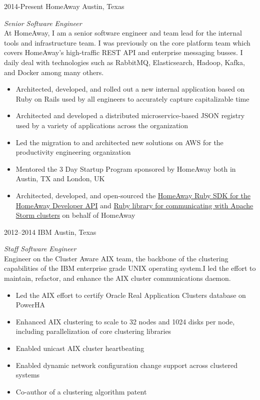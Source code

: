 \documentclass{friggeri-cv} %
\begin{document}
\begin{entrylist}
\entry
{2014-Present}
{HomeAway}
{Austin, Texas}
{\emph{Senior Software Engineer} \\
At HomeAway, I am a senior software engineer and team lead for the internal tools and infrastructure team. I was previously on the core platform team which covers HomeAway's high-traffic REST API and enterprise messaging busses. I daily deal with technologies such as RabbitMQ, Elasticsearch, Hadoop, Kafka, and Docker among many others. \\
\begin{itemize}
\item Architected, developed, and rolled out a new internal application based on Ruby on Rails used by all engineers to accurately capture capitalizable time
\item Architected and developed a distributed microservice-based JSON registry used by a variety of applications across the organization
\item Led the migration to and architected new solutions on AWS for the productivity engineering organization
\item Mentored the 3 Day Startup Program sponsored by HomeAway both in Austin, TX and London, UK
\item Architected, developed, and open-sourced the \href{https://github.com/homeaway/homeaway_api_ruby}{HomeAway Ruby SDK for the HomeAway Developer API} and \href{https://github.com/homeaway/homeaway-storm}{Ruby library for communicating with Apache Storm clusters} on behalf of HomeAway
\end{itemize}}
\end{entrylist}
\begin{entrylist}
\entry
{2012--2014}
{IBM}
{Austin, Texas}
{\emph{Staff Software Engineer} \\
Engineer on the Cluster Aware AIX team, the backbone of the clustering capabilities of the IBM enterprise grade UNIX operating system.I led the effort to maintain, refactor, and enhance the AIX cluster communications daemon. \\
\begin{itemize}
\item Led the AIX effort to certify Oracle Real Application Clusters database on PowerHA
\item Enhanced AIX clustering to scale to 32 nodes and 1024 disks per node, including parallelization of core clustering libraries
\item Enabled unicast AIX cluster heartbeating
\item Enabled dynamic network configuration change support across clustered systems
\item Co-author of a clustering algorithm patent 
\end{itemize}}
\end{entrylist}
\end{document}
